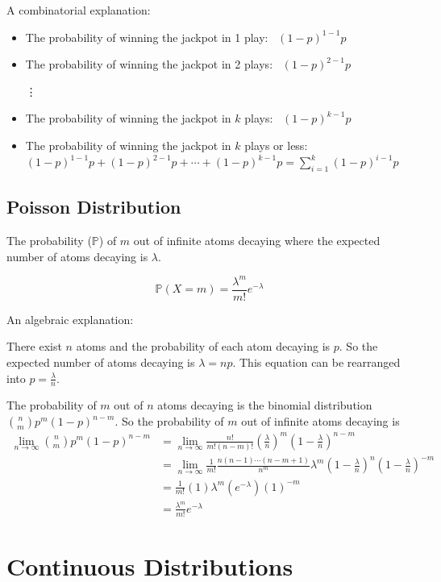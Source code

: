 \documentclass{article}
\begin{document}
	A combinatorial explanation:
	\begin{itemize}
		\item The probability of winning the jackpot in 1 play: \, $(1-p)^{1-1}p$
		\item The probability of winning the jackpot in 2 plays: \, $(1-p)^{2-1}p$
		\item[\vdots]
		\item The probability of winning the jackpot in $k$ plays: \, $(1-p)^{k-1}p$
		\item The probability of winning the jackpot in $k$ plays or less: \, $(1-p)^{1-1}p+(1-p)^{2-1}p+\cdots+(1-p)^{k-1}p=\sum_{i=1}^k(1-p)^{i-1}p$
	\end{itemize}

	\subsection{Poisson Distribution}
	The probability ($\mathbb{P}$) of $m$ out of infinite atoms decaying where the expected number of atoms decaying is $\lambda$.

	\[
		\mathbb{P}(X=m)=\frac{\lambda^m}{m!}e^{-\lambda}
	\]

	An algebraic explanation:

	There exist $n$ atoms and the probability of each atom decaying is $p$. So the expected number of atoms decaying is $\lambda = np$. This equation can be rearranged into $p = \frac{\lambda}{n}$.

	The probability of $m$ out of $n$ atoms decaying is the binomial distribution $\binom{n}{m}p^m(1-p)^{n-m}$. So the probability of $m$ out of infinite atoms decaying is
	\begin{align*}
		\lim_{n\to\infty}\binom{n}{m}p^m(1-p)^{n-m}
		&= \lim_{n\to\infty} \frac{n!}{m!(n-m)!} \left(\frac{\lambda}{n}\right)^m \left(1-\frac{\lambda}{n}\right)^{n-m} \\
		&= \lim_{n\to\infty} \frac{1}{m!} \frac{n(n-1)\cdots(n-m+1)}{n^m} \lambda^m \left(1-\frac{\lambda}{n}\right)^n \left(1-\frac{\lambda}{n}\right)^{-m} \\
		&= \frac{1}{m!} (1) \lambda^m (e^{-\lambda}) (1)^{-m} \\
		&= \frac{\lambda^m}{m!}e^{-\lambda}
	\end{align*}

	\section{Continuous Distributions}
\end{document}

